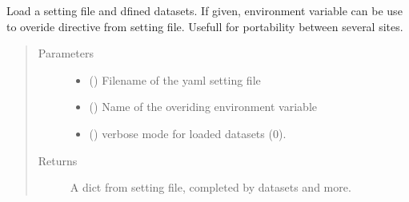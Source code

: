 \documentclass[letterpaper,10pt,english]{sphinxmanual}
\begin{document}

\begin{fulllineitems}
\label{\detokenize{PyTerK:pyterk.config.load}}
\sphinxAtStartPar
Load a setting file and dfined datasets.
If given, environment variable can be use to overide  directive from setting file.
Usefull for portability between several sites.
\begin{quote}\begin{description}
\item[{Parameters}] \leavevmode\begin{itemize}
\item {} 
\sphinxAtStartPar
{} () \textendash{} Filename of the yaml setting file

\item {} 
\sphinxAtStartPar
{} () \textendash{} Name of the overiding environment variable

\item {} 
\sphinxAtStartPar
{} () \textendash{} verbose mode for loaded datasets (0).

\end{itemize}

\item[{Returns}] \leavevmode
\sphinxAtStartPar
A dict from setting file, completed by datasets and more.

\end{description}\end{quote}

\end{fulllineitems}

\end{document}
